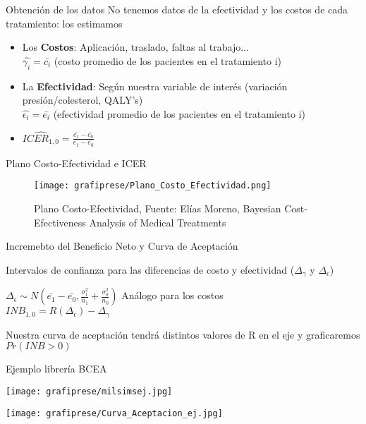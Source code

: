 \documentclass[xcolor=dvipsnames]{beamer}
\begin{document}
\begin{frame}{Obtención de los datos}
    No tenemos datos de la efectividad y los costos de cada tratamiento: los estimamos
    \begin{itemize}
        \item Los \textbf{Costos}: Aplicación, traslado, faltas al trabajo...\\
        $\hat{\gamma_i} = \bar{c_i}$  (costo promedio de los pacientes en el tratamiento i)
        \item La \textbf{Efectividad}: Según nuestra variable de interés (variación presión/colesterol, QALY's)\\
        $\hat{\epsilon_i} = \bar{e_i}$  (efectividad promedio de los pacientes en el tratamiento i)
        \item $\widehat{ICER_{1,0}} = \frac{\bar{c_1}-\bar{c_0}}{\bar{e_1}-\bar{e_0}}$
    
    \end{itemize}
    
\end{frame}

\begin{frame}{Plano Costo-Efectividad e ICER}
    \begin{figure}[htbp]
    \centering
    \texttt{[image: grafiprese/Plano\_Costo\_Efectividad.png]}
    \caption{Plano Costo-Efectividad, Fuente: Elías Moreno, Bayesian Cost-Efectiveness Analysis of Medical Treatments}
\end{figure}
\end{frame}

\begin{frame}{Incremebto del Beneficio Neto y Curva de Aceptación}
    
    Intervalos de confianza para las diferencias de costo y efectividad ($\Delta_\gamma$ y $\Delta_\epsilon$)

    $\Delta_\epsilon \sim N(\bar{e_1}-\bar{e_0},\frac{\sigma_1^2}{n_1}+\frac{\sigma_0^2}{n_0})$ Análogo para los costos \\

    $INB_{1,0}=R(\Delta_\epsilon) - \Delta_\gamma$

    Nuestra curva de aceptación tendrá distintos valores de R en el eje y graficaremos $Pr(INB>0)$

\end{frame}

\begin{frame}{Ejemplo librería BCEA}
\begin{minipage}{0.48\textwidth}
  \centering
  \texttt{[image: grafiprese/milsimsej.jpg]}
\end{minipage}
\hfill
\begin{minipage}{0.48\textwidth}
  \centering
  \texttt{[image: grafiprese/Curva\_Aceptacion\_ej.jpg]}
\end{minipage}
\end{frame}
\end{document}
